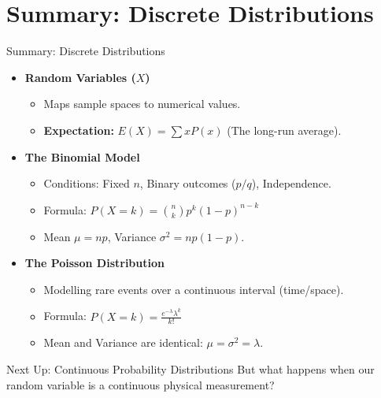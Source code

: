 \section{Summary: Discrete Distributions}
\begin{frame}{Summary: Discrete Distributions}
    \small
    \begin{itemize}
        \item \textbf{Random Variables ($X$)}
            \begin{itemize}
                \item Maps sample spaces to numerical values.
                \item \textbf{Expectation:} $E(X) = \sum x P(x)$ (The long-run average).
            \end{itemize}
        \vspace{0.2cm}
        \item \textbf{The Binomial Model}
            \begin{itemize}
                \item Conditions: Fixed $n$, Binary outcomes ($p/q$), Independence.
                \item Formula: $P(X=k) = \binom{n}{k} p^k (1-p)^{n-k}$
                \item Mean $\mu = np$, Variance $\sigma^2 = np(1-p)$.
            \end{itemize}
        \vspace{0.2cm}
        \item \textbf{The Poisson Distribution}
            \begin{itemize}
                \item Modelling rare events over a continuous interval (time/space).
                \item Formula: $P(X=k) = \frac{e^{-\lambda} \lambda^k}{k!}$
                \item Mean and Variance are identical: $\mu = \sigma^2 = \lambda$.
            \end{itemize}
    \end{itemize}


    \begin{block}{Next Up: Continuous Probability Distributions}
         But what happens when our random variable is a continuous physical measurement? 
    \end{block}
\end{frame}

